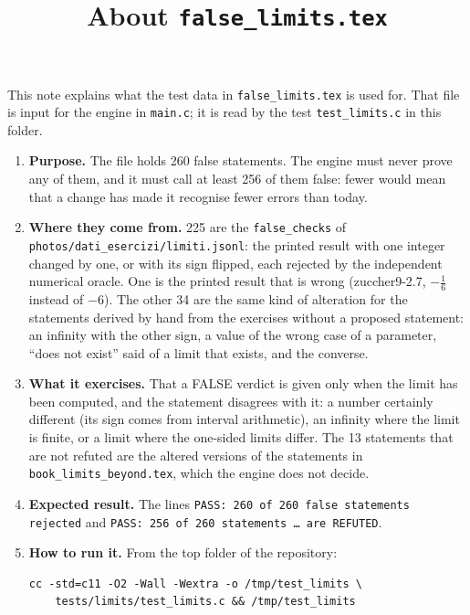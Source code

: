 \documentclass[11pt,a4paper]{article}
\title{About \texttt{false\_limits.tex}}
\author{}
\date{}
\begin{document}
\maketitle
This note explains what the test data in \texttt{false\_limits.tex} is used for. That file is input for the engine in \texttt{main.c}; it is read by the test \texttt{test\_limits.c} in this folder.

\begin{enumerate}
\item \textbf{Purpose.} The file holds 260 false statements. The engine must never prove any of them, and it must call at least 256 of them false: fewer would mean that a change has made it recognise fewer errors than today.

\item \textbf{Where they come from.} 225 are the \texttt{false\_checks} of \texttt{photos/dati\_esercizi/limiti.jsonl}: the printed result with one integer changed by one, or with its sign flipped, each rejected by the independent numerical oracle. One is the printed result that is wrong (zuccher9-2.7, $-\frac{1}{6}$ instead of $-6$). The other 34 are the same kind of alteration for the statements derived by hand from the exercises without a proposed statement: an infinity with the other sign, a value of the wrong case of a parameter, ``does not exist'' said of a limit that exists, and the converse.

\item \textbf{What it exercises.} That a FALSE verdict is given only when the limit has been computed, and the statement disagrees with it: a number certainly different (its sign comes from interval arithmetic), an infinity where the limit is finite, or a limit where the one-sided limits differ. The 13 statements that are not refuted are the altered versions of the statements in \texttt{book\_limits\_beyond.tex}, which the engine does not decide.

\item \textbf{Expected result.} The lines \texttt{PASS: 260 of 260 false statements rejected} and \texttt{PASS: 256 of 260 statements \dots{} are REFUTED}.

\item \textbf{How to run it.} From the top folder of the repository:
\begin{verbatim}
cc -std=c11 -O2 -Wall -Wextra -o /tmp/test_limits \
    tests/limits/test_limits.c && /tmp/test_limits
\end{verbatim}
\end{enumerate}
\end{document}
